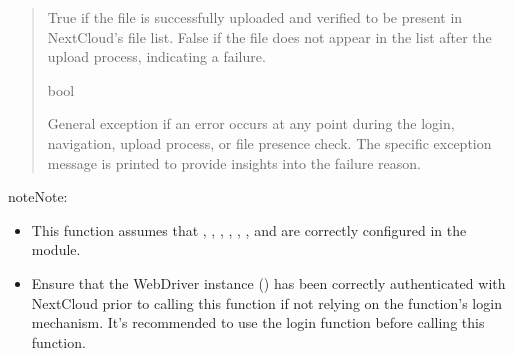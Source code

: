 \documentclass[letterpaper,10pt,english]{sphinxmanual}
\begin{document}
\begin{fulllineitems}
\begin{quote}
\begin{description}
\begin{itemize}
\end{itemize}

\sphinxAtStartPar
True if the file is successfully uploaded and verified to be present in NextCloud’s file list.
False if the file does not appear in the list after the upload process, indicating a failure.

\sphinxAtStartPar
bool

\sphinxAtStartPar
{} \textendash{} General exception if an error occurs at any point during the login, navigation, upload process,
or file presence check. The specific exception message is printed to provide insights into the
failure reason.

\end{description}\end{quote}

\begin{sphinxadmonition}{note}{Note:}\begin{itemize}
\item {} 
\sphinxAtStartPar
This function assumes that , , , , ,
, and  are correctly configured in the
 module.

\item {} 
\sphinxAtStartPar
Ensure that the WebDriver instance () has been correctly authenticated with NextCloud prior to
calling this function if not relying on the function’s login mechanism. It’s recommended to use the login function before calling this function.

\end{itemize}
\end{sphinxadmonition}

\begin{sphinxVerbatim}[commandchars=\\\{\}]
   
  
  
   
 
\end{sphinxVerbatim}

\end{fulllineitems}
\end{document}
